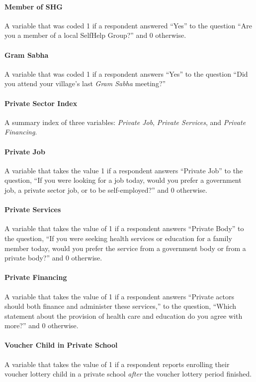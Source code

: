 \documentclass[hidelinks, 12pt, titlepage]{article}
\begin{document}
			\paragraph{Member of SHG} A variable that was coded 1 if a respondent answered ``Yes'' to the question ``Are you a member of a local SelfHelp Group?'' and 0 otherwise.

			\paragraph{Gram Sabha} A variable that was coded 1 if a respondent answers ``Yes'' to the question ``Did you attend your village's last \emph{Gram Sabha} meeting?''

			\paragraph{Private Sector Index} A summary index of three variables: \emph{Private Job}, \emph{Private Services}, and \emph{Private Financing}.

			\paragraph{Private Job} A variable that takes the value 1 if a respondent answers ``Private Job'' to the question, ``If you were looking for a job today, would you prefer a government job, a private sector job, or to be self-employed?'' and 0 otherwise.

			\paragraph{Private Services} A variable that takes the value of 1 if a respondent answers ``Private Body'' to the question, ``If you were seeking health services or education for a family member today, would you prefer the service from a government body or from a private body?'' and 0 otherwise.

			\paragraph{Private Financing} A variable that takes the value of 1 if a respondent answers ``Private actors should both finance and administer these services,'' to the question, ``Which statement about the provision of health care and education do you agree with more?'' and 0 otherwise.

			\paragraph{Voucher Child in Private School} A variable that takes the value of 1 if a respondent reports enrolling their voucher lottery child in a private school \emph{after} the voucher lottery period finished.
\end{document}
